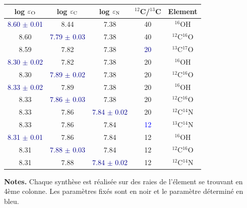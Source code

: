 \begin{table}[h!]
  \vspace{0.3cm}
\begin{center}
	\begin{tabular}{ccccc}
        \hline
		\hline
        log $\varepsilon_{\rm O}$ & log $\varepsilon_{\rm C}$ & log $\varepsilon_{\rm N}$ & $^{12}$C/$^{13}$C & Element\\
        \hline
    \textcolor{darkblue}{8.60 $\pm$ 0.01} & 8.44 & 7.38 & 40 & $^{16}$OH \\
    8.60 & \textcolor{darkblue}{7.79 $\pm$ 0.03} & 7.38 & 40 & $^{12}$C$^{16}$O \\
    8.59 & 7.82 & 7.38 & \textcolor{darkblue}{20} & $^{13}$C$^{17}$O \\
    \textcolor{darkblue}{8.30 $\pm$ 0.02} & 7.82 & 7.38 & 20 & $^{16}$OH \\
    8.30 & \textcolor{darkblue}{7.89 $\pm$ 0.02} & 7.38 & 20 & $^{12}$C$^{16}$O \\
    \textcolor{darkblue}{8.33 $\pm$ 0.02} & 7.89 & 7.38 & 20 & $^{16}$OH \\
    8.33 & \textcolor{darkblue}{7.86 $\pm$ 0.03} & 7.38 & 20 & $^{12}$C$^{16}$O \\
    8.33 & 7.86 & \textcolor{darkblue}{7.84 $\pm$ 0.02} & 20 & $^{12}$C$^{14}$N \\
    8.33 & 7.86 & 7.84 & \textcolor{blue}{12} & $^{13}$C$^{14}$N \\
    \textcolor{darkblue}{8.31 $\pm$ 0.01} & 7.86 & 7.84 & 12 & $^{16}$OH \\
    8.31 & \textcolor{darkblue}{7.88 $\pm$ 0.03} & 7.84 & 12 & $^{12}$C$^{16}$O \\
    8.31 & 7.88 & \textcolor{darkblue}{7.84 $\pm$ 0.02} & 12 & $^{12}$C$^{14}$N \\
    \end{tabular}
\end{center} 
\textbf{Notes.} 
Chaque synthèse est réalisée sur des raies de l'élement se trouvant en 4ème colonne. 
Les paramètres fixés sont en noir et le paramètre déterminé en bleu. 
\label{itération_CNO}
\end{table}

